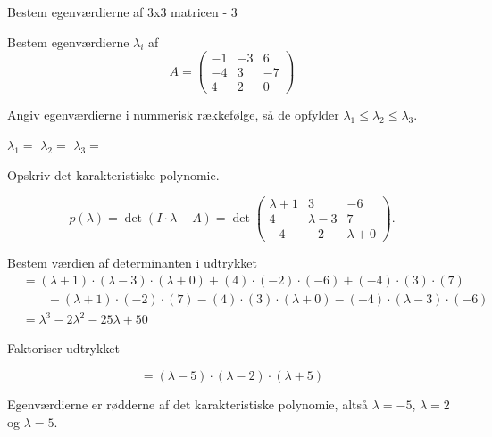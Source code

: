 \documentclass{article}
\begin{document}
\begin{exercise}{Bestem egenværdierne af 3x3 matricen - 3}

Bestem egenværdierne $\lambda_i$ af 
\[
A=\begin{pmatrix}
-1 & -3 & 6 \\
-4 & 3 & -7 \\
4 & 2 & 0
\end{pmatrix}
\]

Angiv egenværdierne i nummerisk rækkefølge, så de
opfylder $\lambda_1 \le \lambda_2 \le \lambda_3$.

$\lambda_1 = $
$\lambda_2 = $
$\lambda_3 = $

\hint
Opskriv det karakteristiske polynomie.

\hint
\[
p(\lambda)=\det\left(I \cdot \lambda - A \right)=\det\begin{pmatrix}
\lambda + 1 & 3 & -6 \\
4 & \lambda - 3 & 7 \\
-4 & -2 & \lambda + 0
\end{pmatrix}.
\]

\hint
Bestem værdien af determinanten i udtrykket
\begin{align*}
&=(\lambda+1) \cdot (\lambda-3) \cdot (\lambda+0)+(4) \cdot (-2) \cdot (-6)+(-4) \cdot (3) \cdot (7) \\
&\qquad -(\lambda+1) \cdot (-2) \cdot (7)-(4) \cdot (3) \cdot (\lambda+0)-(-4) \cdot (\lambda-3) \cdot (-6) \\
&=\lambda^3-2\lambda^2-25\lambda+50
\end{align*}

\hint
Faktoriser udtrykket

\hint
\[
=(\lambda-5) \cdot (\lambda-2) \cdot (\lambda+5)
\]

\hint
Egenværdierne er rødderne af det karakteristiske polynomie, 
altså
$\lambda=-5$, $\lambda=2$ og $\lambda=5$.

\end{exercise}
\end{document}
